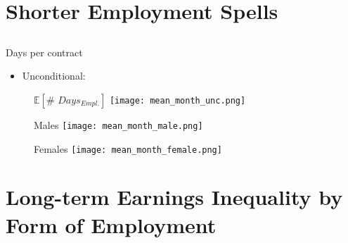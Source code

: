 \documentclass[hyperref={bookmarks=false}]{beamer}
\begin{document}
\begin{appendix}
\section{Shorter Employment Spells}
\subsection{}

\begin{frame}
\label{SES}
\end{frame}

\begin{frame}{Days per contract}
\begin{itemize}
\item  Unconditional:
\end{itemize}
\begin{figure}[!t]
\centering
\begin{minipage}[b]{0.3\textwidth}{$\mathbb{E}[\# \,\, Days_{Empl.}]$}
\centering
\texttt{[image: mean\_month\_unc.png]}
\end{minipage}
\begin{minipage}[b]{0.3\textwidth}{Males}
\centering
\texttt{[image: mean\_month\_male.png]}
\end{minipage}
\begin{minipage}[b]{0.3\textwidth}{Females}
\centering
\texttt{[image: mean\_month\_female.png]}
\end{minipage}
\end{figure}
\end{frame}

\section{Long-term Earnings Inequality by Form of Employment}
\subsection{}

\begin{frame}
\label{EIF}
\end{frame}



\end{appendix}
\end{document}
